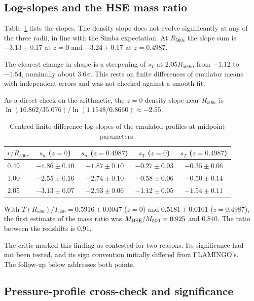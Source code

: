 \documentclass[11pt,a4paper]{article}
\begin{document}
\subsection{Log-slopes and the HSE mass ratio}

Table~\ref{tab:slopes} lists the slopes. The density slope does not evolve significantly at any of the three radii, in line with the Simba expectation. At $R_{500c}$ the slope sum is $-3.13\pm0.17$ at $z=0$ and $-3.24\pm0.17$ at $z=0.4987$.

The clearest change in shape is a steepening of $s_T$ at $2.05R_{500c}$, from $-1.12$ to $-1.54$, nominally about $3.6\sigma$. This rests on finite differences of emulator means with independent errors and was not checked against a smooth fit.

As a direct check on the arithmetic, the $z=0$ density slope near $R_{500c}$ is $\ln(16.862/35.076)/\ln(1.1548/0.8660)\approx-2.55$.

\begin{table}
\centering
\begin{tabular}{lcccc}
\toprule
$r/R_{500c}$ & $s_n$ ($z=0$) & $s_n$ ($z=0.4987$) & $s_T$ ($z=0$) & $s_T$ ($z=0.4987$)\\
\midrule
0.49 & $-1.86\pm0.10$ & $-1.87\pm0.10$ & $-0.27\pm0.03$ & $-0.35\pm0.06$\\
1.00 & $-2.55\pm0.16$ & $-2.74\pm0.10$ & $-0.58\pm0.06$ & $-0.50\pm0.14$\\
2.05 & $-3.13\pm0.07$ & $-2.93\pm0.06$ & $-1.12\pm0.05$ & $-1.54\pm0.11$\\
\bottomrule
\end{tabular}
\caption{Centred finite-difference log-slopes of the emulated profiles at midpoint parameters.}
\label{tab:slopes}
\end{table}

With $T(R_{500})/T_{500}=0.5916\pm0.0047$ ($z=0$) and $0.5181\pm0.0101$ ($z=0.4987$), the first estimate of the mass ratio was $M_{\rm HSE}/M_{500}=0.925$ and $0.840$. The ratio between the redshifts is 0.91.

The critic marked this finding as contested for two reasons. Its significance had not been tested, and its sign convention initially differed from FLAMINGO's. The follow-up below addresses both points.

\subsection{Pressure-profile cross-check and significance}
\end{document}
